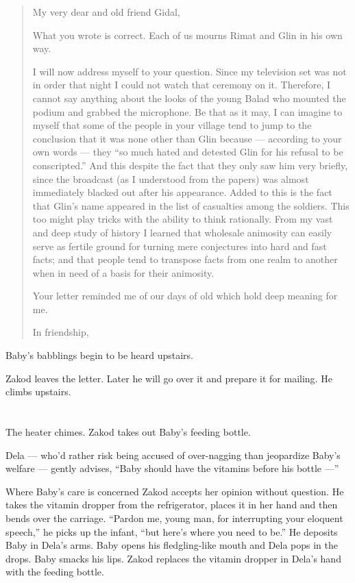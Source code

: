 \documentclass[twoside,11pt,openany]{book}
\begin{document}
\begin{quotation}
My very dear and old friend Gidal,

What you wrote is correct. Each of us mourns Rimat and Glin in his own way.

I will now address myself to your question.  Since my television set was not in order that night I could not watch that
ceremony on it. Therefore, I cannot say anything about the looks of the young Balad who mounted the podium and
grabbed the microphone. Be that as it may, I can imagine to myself that some of the people in your village tend to jump
to the conclusion that it was none other than Glin because --- according to your own words --- they ``so
much hated and detested Glin for his refusal to be conscripted.'' And this despite the fact that they only
saw him very briefly, since the broadcast (as I understood from the papers) was almost immediately blacked out after
his appearance. Added to this is the fact that Glin's name appeared in the list of casualties among the soldiers. This
too might play tricks with the ability to think rationally. From my vast and deep study of history I learned that
wholesale animosity can easily serve as fertile ground for turning mere
conjectures into hard and fast facts; and that
people tend to transpose facts from one realm to another when in need of a basis for their animosity.

Your letter reminded me of our days of old which hold deep meaning for me.

In friendship,
\end{quotation}

Baby's babblings begin to be heard upstairs.

Zakod leaves the letter. Later he will go over it and prepare it for mailing. He climbs upstairs.



\chapter{}

The heater chimes. Zakod takes out Baby's feeding bottle.

Dela --- who'd rather risk being accused of over-nagging than jeopardize Baby's welfare --- gently advises,
``Baby should have the vitamins before his bottle ---''

Where Baby's care is concerned Zakod accepts her opinion without question. He takes the vitamin dropper
from the refrigerator, places it in her hand and then bends over the carriage. ``Pardon me, young man,
for interrupting your eloquent speech,'' he picks up the infant, ``but here's where you need to
be.'' He deposits Baby in Dela's arms. Baby opens his fledgling-like mouth and Dela pops in the drops.
Baby smacks his lips. Zakod replaces the vitamin dropper in Dela's hand with the feeding bottle.
\end{document}
